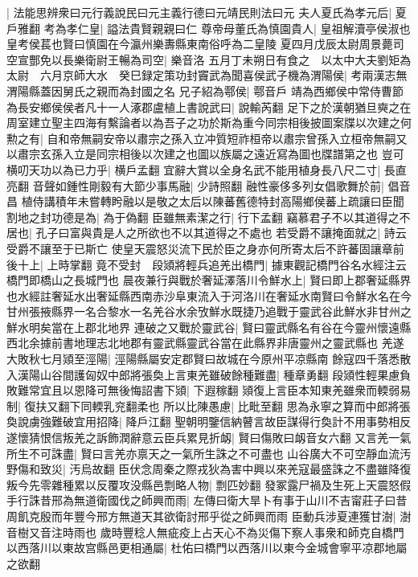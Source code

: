 |{
	法能思辨衆曰元行義說民曰元主義行德曰元靖民則法曰元}
夫人夏氏為孝元后|{
	夏戶雅翻}
考為孝仁皇|{
	謚法貴賢親親曰仁}
尊帝母董氏為慎園貴人|{
	皇祖解瀆亭侯淑也皇考侯萇也賢曰慎園在今瀛州樂夀縣東南俗呼為二皇陵}
夏四月戊辰太尉周景薨司空宣酆免以長樂衛尉王暢為司空|{
	樂音洛}
五月丁未朔日有食之　以太中大夫劉矩為太尉　六月京師大水　癸巳録定策功封竇武為聞喜侯武子機為渭陽侯|{
	考兩漢志無渭陽縣蓋因舅氏之親而為封國之名}
兄子紹為鄠侯|{
	鄠音戶}
靖為西鄉侯中常侍曹節為長安鄉侯侯者凡十一人涿郡盧植上書說武曰|{
	說輸芮翻}
足下之於漢朝猶旦奭之在周室建立聖主四海有繫論者以為吾子之功於斯為重今同宗相後披圖案牒以次建之何勲之有|{
	自和帝無嗣安帝以肅宗之孫入立冲質短祚桓帝以肅宗曾孫入立桓帝無嗣又以肅宗玄孫入立是同宗相後以次建之也圖以族屬之遠近寫為圖也牒譜第之也}
豈可横叨天功以為已力乎|{
	横戶孟翻}
宜辭大賞以全身名武不能用植身長八尺二寸|{
	長直亮翻}
音聲如鍾性剛毅有大節少事馬融|{
	少詩照翻}
融性豪侈多列女倡歌舞於前|{
	倡音昌}
植侍講積年未嘗轉盻融以是敬之太后以陳蕃舊德特封高陽鄉侯蕃上疏讓曰臣聞割地之封功德是為|{
	為于偽翻}
臣雖無素潔之行|{
	行下孟翻}
竊慕君子不以其道得之不居也|{
	孔子曰富與貴是人之所欲也不以其道得之不處也}
若受爵不讓掩面就之|{
	詩云受爵不讓至于已斯亡}
使皇天震怒災流下民於臣之身亦何所寄太后不許蕃固讓章前後十上|{
	上時掌翻}
竟不受封　段熲將輕兵追羌出橋門|{
	據東觀記橋門谷名水經注云橋門即橋山之長城門也}
晨夜兼行與戰於奢延澤落川令鮮水上|{
	賢曰即上郡奢延縣界也水經註奢延水出奢延縣西南赤沙阜東流入于河洛川在奢延水南賢曰令鮮水名在今甘州張掖縣界一名合黎水一名羌谷水余攷鮮水既捷乃追戰于靈武谷此鮮水非甘州之鮮水明矣當在上郡北地界}
連破之又戰於靈武谷|{
	賢曰靈武縣名有谷在今靈州懷遠縣西北余據前書地理志北地郡有靈武縣靈武谷當在此縣界非唐靈州之靈武縣也}
羌遂大敗秋七月熲至涇陽|{
	涇陽縣屬安定郡賢曰故城在今原州平凉縣南}
餘寇四千落悉散入漢陽山谷間護匈奴中郎將張奐上言東羌雖破餘種難盡|{
	種章勇翻}
段熲性輕果慮負敗難常宜且以恩降可無後悔詔書下熲|{
	下遐稼翻}
熲復上言臣本知東羌雖衆而輭弱易制|{
	復扶又翻下同輭乳兖翻柔也}
所以比陳愚慮|{
	比毗至翻}
思為永寧之算而中郎將張奐說虜強難破宜用招降|{
	降戶江翻}
聖朝明鑒信納瞽言故臣謀得行奐計不用事勢相反遂懷猜恨信叛羌之訴飾潤辭意云臣兵累見折衂|{
	賢曰傷敗曰衂音女六翻}
又言羌一氣所生不可誅盡|{
	賢曰言羌亦禀天之一氣所生誅之不可盡也}
山谷廣大不可空靜血流汚野傷和致災|{
	汚烏故翻}
臣伏念周秦之際戎狄為害中興以來羌寇最盛誅之不盡雖降復叛今先零雜種累以反覆攻没縣邑剽略人物|{
	剽匹妙翻}
發冢露尸禍及生死上天震怒假手行誅昔邢為無道衛國伐之師興而雨|{
	左傳曰衛大旱卜有事于山川不吉甯莊子曰昔周飢克殷而年豐今邢方無道天其欲衛討邢乎從之師興而雨}
臣動兵涉夏連獲甘澍|{
	澍音樹又音注時雨也}
歲時豐稔人無疵疫上占天心不為災傷下察人事衆和師克自橋門以西落川以東故宫縣邑更相通屬|{
	杜佑曰橋門以西落川以東今金城會寧平凉郡地屬之欲翻}
